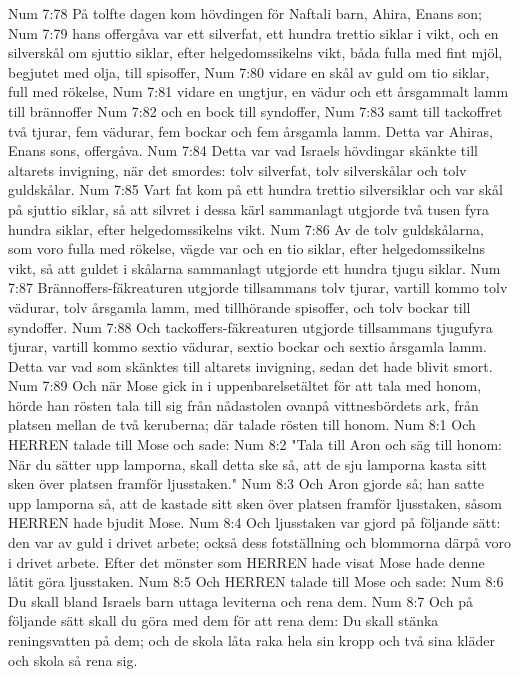 Num 7:78  På tolfte dagen kom hövdingen för Naftali barn, Ahira, Enans son;
Num 7:79  hans offergåva var ett silverfat, ett hundra trettio siklar i vikt, och en silverskål om sjuttio siklar, efter helgedomssikelns vikt, båda fulla med fint mjöl, begjutet med olja, till spisoffer,
Num 7:80  vidare en skål av guld om tio siklar, full med rökelse,
Num 7:81  vidare en ungtjur, en vädur och ett årsgammalt lamm till brännoffer
Num 7:82  och en bock till syndoffer,
Num 7:83  samt till tackoffret två tjurar, fem vädurar, fem bockar och fem årsgamla lamm. Detta var Ahiras, Enans sons, offergåva.
Num 7:84  Detta var vad Israels hövdingar skänkte till altarets invigning, när det smordes: tolv silverfat, tolv silverskålar och tolv guldskålar.
Num 7:85  Vart fat kom på ett hundra trettio silversiklar och var skål på sjuttio siklar, så att silvret i dessa kärl sammanlagt utgjorde två tusen fyra hundra siklar, efter helgedomssikelns vikt.
Num 7:86  Av de tolv guldskålarna, som voro fulla med rökelse, vägde var och en tio siklar, efter helgedomssikelns vikt, så att guldet i skålarna sammanlagt utgjorde ett hundra tjugu siklar.
Num 7:87  Brännoffers-fäkreaturen utgjorde tillsammans tolv tjurar, vartill kommo tolv vädurar, tolv årsgamla lamm, med tillhörande spisoffer, och tolv bockar till syndoffer.
Num 7:88  Och tackoffers-fäkreaturen utgjorde tillsammans tjugufyra tjurar, vartill kommo sextio vädurar, sextio bockar och sextio årsgamla lamm. Detta var vad som skänktes till altarets invigning, sedan det hade blivit smort.
Num 7:89  Och när Mose gick in i uppenbarelsetältet för att tala med honom, hörde han rösten tala till sig från nådastolen ovanpå vittnesbördets ark, från platsen mellan de två keruberna; där talade rösten till honom.
Num 8:1  Och HERREN talade till Mose och sade:
Num 8:2  "Tala till Aron och säg till honom: När du sätter upp lamporna, skall detta ske så, att de sju lamporna kasta sitt sken över platsen framför ljusstaken."
Num 8:3  Och Aron gjorde så; han satte upp lamporna så, att de kastade sitt sken över platsen framför ljusstaken, såsom HERREN hade bjudit Mose.
Num 8:4  Och ljusstaken var gjord på följande sätt: den var av guld i drivet arbete; också dess fotställning och blommorna därpå voro i drivet arbete. Efter det mönster som HERREN hade visat Mose hade denne låtit göra ljusstaken.
Num 8:5  Och HERREN talade till Mose och sade:
Num 8:6  Du skall bland Israels barn uttaga leviterna och rena dem.
Num 8:7  Och på följande sätt skall du göra med dem för att rena dem: Du skall stänka reningsvatten på dem; och de skola låta raka hela sin kropp och två sina kläder och skola så rena sig.
